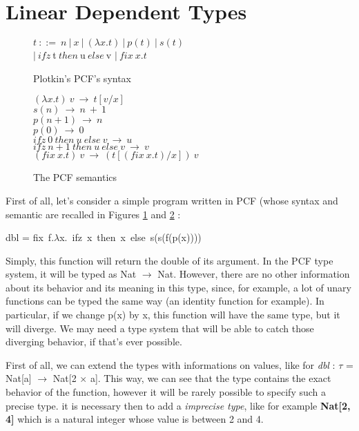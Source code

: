\documentclass[a4paper,12pt]{report}
\begin{document}
\section{Linear Dependent Types}

\begin{figure}
  \begin{center}
    $t~::=~n~|~x~|~(\lambda x.t)~|~p(t)~|~s(t)$ \\
    $|~ifz~$t$~then~$u$~else~$v $|~fix~x.t$
  \end{center}
  \caption{Plotkin's PCF's syntax}
  \label{pcf-syntax}
\end{figure}

\begin{figure}
  \begin{center}
    $(\lambda x.t)~v~\rightarrow~ t[v/x]$ \\
    $s(n)~\rightarrow~ n~+~1$ \\
    $p(n+1)~\rightarrow~ n$ \\
    $p(0)~\rightarrow~ 0$ \\
    $ifz~0~then~u~else~v~\rightarrow~u$ \\
    $ifz~n+1~then~u~else~v~\rightarrow~v$ \\
    $(fix~x.t)~v~\rightarrow~(t[(fix~x.t)/x])~v$
  \end{center}
  \caption{The PCF semantics}
  \label{pcf-sem}
\end{figure}

First of all, let's consider a simple program written in PCF (whose syntax and
semantic are recalled in Figures \ref{pcf-syntax} and \ref{pcf-sem} :

\begin{center} 
  dbl = fix~f.$\lambda $x.~ifz~x~then~x~else~s(s(f(p(x)))) 
\end{center}

Simply, this function will return the double of its argument. In the PCF type
system, it will be typed as Nat $\rightarrow$ Nat. However, there are no other
information about its behavior and its meaning in this type, since, for example,
a lot of unary functions can be typed the same way (an identity function for
example). In particular, if we change p(x) by x, this function will have the
same type, but it will diverge. We may need a type system that will be able to
catch those diverging behavior, if that's ever possible.

First of all, we can extend the types with informations on values, like for
\emph{dbl} : $\tau$ = Nat[a] $\rightarrow$ Nat[2 $\times$ a]. This way, we can
see that the type contains the exact behavior of the function, however it will
be rarely possible to specify such a precise type. it is necessary then to add a
\emph{imprecise type}, like for example \textbf{Nat[2, 4]} which is a natural
integer whose value is between 2 and 4.
\end{document}
